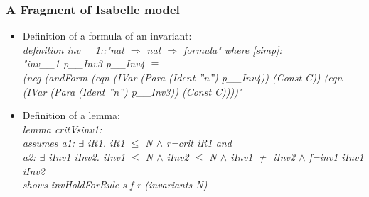 \documentclass{beamer}
\def \iInv {iInv}
\def \iR {iR}
\begin{document}
\begin{frame}\frametitle{A Fragment of Isabelle model}

\begin{itemize}
\item Definition of a formula of an invariant:\\
\emph{
definition inv\_\_1::"nat $\Rightarrow$ nat $\Rightarrow$ formula" where [simp]:\\
"inv\_\_1 p\_\_Inv3 p\_\_Inv4 $\equiv$\\
(neg (andForm (eqn (IVar (Para (Ident ''n'') p\_\_Inv4)) (Const C)) (eqn (IVar (Para (Ident ''n'') p\_\_Inv3)) (Const C))))"\\
}
\item Definition of a lemma: \\
\emph{
lemma critVsinv1:\\
  assumes  a1: $\exists$ \iR1. \iR1 $\le$ N $\wedge$ r=crit \iR1 and \\
  a2: $\exists$  \iInv1 \iInv2. \iInv1 $\le$ N $\wedge$ \iInv2 $\le$ N $\wedge$ \iInv1 $\neq$ \iInv2 $\wedge$ f=inv1  \iInv1 \iInv2\\
  shows  invHoldForRule s f r (invariants   N)\\
}
\end{itemize}
\end{frame}
\end{document}
